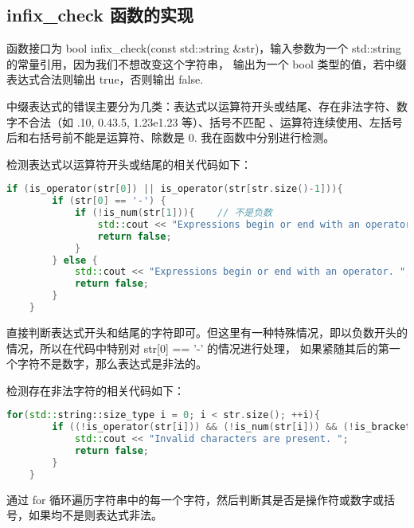 \documentclass[UTF8]{ctexart}
\begin{document}
\subsection{infix\_check 函数的实现}
函数接口为 bool infix\_check(const std::string \&str)，输入参数为一个 std::string 的常量引用，因为我们不想改变这个字符串，
输出为一个 bool 类型的值，若中缀表达式合法则输出 true，否则输出 false. 

中缀表达式的错误主要分为几类：表达式以运算符开头或结尾、存在非法字符、数字不合法（如 .10, 0.43.5, 1.23e1.23 等）、括号不匹配
、运算符连续使用、左括号后和右括号前不能是运算符、除数是 0. 我在函数中分别进行检测。

检测表达式以运算符开头或结尾的相关代码如下：
\begin{lstlisting}[language=c++, breaklines=true, keywordstyle=\color{blue!70}, commentstyle=\color{red!50!green!50!blue!50}, frame=shadowbox, rulesepcolor=\color{red!20!green!20!blue!20}]
    if (is_operator(str[0]) || is_operator(str[str.size()-1])){
        if (str[0] == '-') {
            if (!is_num(str[1])){    // 不是负数
                std::cout << "Expressions begin or end with an operator. "; 
                return false; 
            }
        } else {
            std::cout << "Expressions begin or end with an operator. "; 
            return false; 
        }
    }
\end{lstlisting}
直接判断表达式开头和结尾的字符即可。但这里有一种特殊情况，即以负数开头的情况，所以在代码中特别对 str[0] == '-' 的情况进行处理，
如果紧随其后的第一个字符不是数字，那么表达式是非法的。

检测存在非法字符的相关代码如下：
\begin{lstlisting}[language=c++, breaklines=true, keywordstyle=\color{blue!70}, commentstyle=\color{red!50!green!50!blue!50}, frame=shadowbox, rulesepcolor=\color{red!20!green!20!blue!20}]
    for(std::string::size_type i = 0; i < str.size(); ++i){
        if ((!is_operator(str[i])) && (!is_num(str[i])) && (!is_bracket(str[i]))){
            std::cout << "Invalid characters are present. "; 
            return false; 
        }
    }
\end{lstlisting}
通过 for 循环遍历字符串中的每一个字符，然后判断其是否是操作符或数字或括号，如果均不是则表达式非法。
\end{document}
